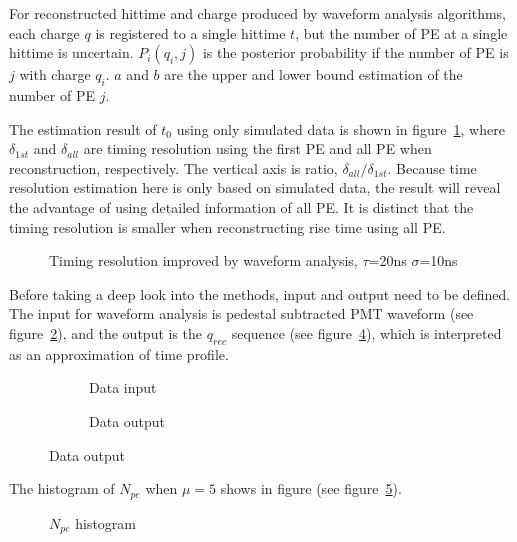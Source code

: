 For reconstructed hittime and charge produced by waveform analysis algorithms, each charge $q$ is registered to a single hittime $t$, but the number of PE at a single hittime is uncertain. $P_{i}(q_{i},j)$ is the posterior probability if the number of PE is $j$ with charge $q_{i}$. $a$ and $b$ are the upper and lower bound estimation of the number of PE $j$. 

The estimation result of $t_{0}$ using only simulated data is shown in figure~\ref{fig:reso-diff}, where $\delta_{1st}$ and $\delta_{all}$ are timing resolution using the first PE and all PE when reconstruction, respectively. The vertical axis is ratio, $\delta_{all}/\delta_{1st}$. Because time resolution estimation here is only based on simulated data, the result will reveal the advantage of using detailed information of all PE. It is distinct that the timing resolution is smaller when reconstructing rise time using all PE. 

\begin{figure}[H]
    \centering
    \scalebox{0.5}{}
    \caption{\label{fig:reso-diff} Timing resolution improved by waveform analysis, $\tau$=20ns $\sigma$=10ns}
\end{figure}

Before taking a deep look into the methods, input and output need to be defined. The input for waveform analysis is pedestal subtracted PMT waveform (see figure~\ref{fig:input}), and the output is the $q_{rec}$ sequence (see figure~\ref{fig:output}), which is interpreted as an approximation of time profile. 

\begin{figure}[H]
\begin{minipage}[b]{.5\textwidth}
\begin{figure}[H]
    \centering
    \resizebox{\textwidth}{!}{}
    \caption{\label{fig:input} Data input}
\end{figure}
\end{minipage}
\begin{minipage}[b]{.5\textwidth}
\begin{figure}[H]
    \centering
    \resizebox{\textwidth}{!}{}
    \caption{\label{fig:output} Data output}
\end{figure}
\end{minipage}
\end{figure}

The histogram of $N_{pe}$ when $\mu=5$ shows in figure (see figure~\ref{fig:penum}). 

\begin{figure}[H]
    \centering
    \scalebox{0.4}{}
    \caption{\label{fig:penum} $N_{pe}$ histogram}
\end{figure}

